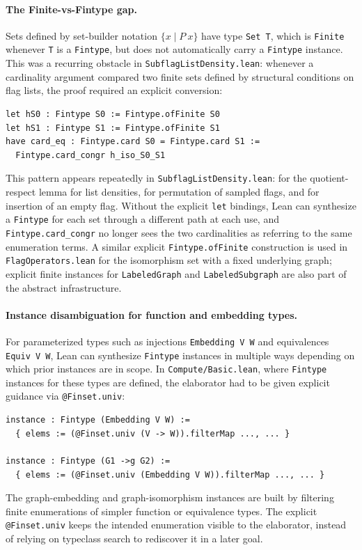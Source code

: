 \documentclass{article}
\newcommand{\lean}[1]{\texttt{#1}}
\begin{document}
\paragraph{The Finite-vs-Fintype gap.}
Sets defined by set-builder notation $\{x \mid P\ x\}$ have type
\lean{Set T}, which is \lean{Finite} whenever \lean{T} is a \lean{Fintype},
but does not automatically carry a \lean{Fintype} instance.  This was a
recurring obstacle in \lean{SubflagListDensity.lean}: whenever a cardinality
argument compared two finite sets defined by structural conditions on flag lists,
the proof required an explicit conversion:
\begin{lstlisting}
let hS0 : Fintype S0 := Fintype.ofFinite S0
let hS1 : Fintype S1 := Fintype.ofFinite S1
have card_eq : Fintype.card S0 = Fintype.card S1 :=
  Fintype.card_congr h_iso_S0_S1
\end{lstlisting}
This pattern appears repeatedly in \lean{SubflagListDensity.lean}: for the
quotient-respect lemma for list densities, for permutation of sampled flags,
and for insertion of an empty flag.  Without the explicit \lean{let} bindings,
Lean can synthesize a \lean{Fintype} for each set through a different path at
each use, and \lean{Fintype.card\_congr} no longer sees the two cardinalities
as referring to the same enumeration terms.  A similar explicit
\lean{Fintype.ofFinite} construction is used in \lean{FlagOperators.lean} for
the isomorphism set with a fixed underlying graph; explicit finite instances
for \lean{LabeledGraph} and \lean{LabeledSubgraph} are also part of the
abstract infrastructure.

\paragraph{Instance disambiguation for function and embedding types.}
For parameterized types such as injections \lean{Embedding V W} and equivalences
\lean{Equiv V W}, Lean can synthesize \lean{Fintype} instances in multiple ways
depending on which prior instances are in scope.  In
\lean{Compute/Basic.lean}, where \lean{Fintype} instances for these types are
defined, the elaborator had to be given explicit guidance via
\lean{@Finset.univ}:
\begin{lstlisting}
instance : Fintype (Embedding V W) :=
  { elems := (@Finset.univ (V -> W)).filterMap ..., ... }

instance : Fintype (G1 ->g G2) :=
  { elems := (@Finset.univ (Embedding V W)).filterMap ..., ... }
\end{lstlisting}
The graph-embedding and graph-isomorphism instances are built by filtering
finite enumerations of simpler function or equivalence types.  The explicit
\lean{@Finset.univ} keeps the intended enumeration visible to the elaborator,
instead of relying on typeclass search to rediscover it in a later goal.
\end{document}
